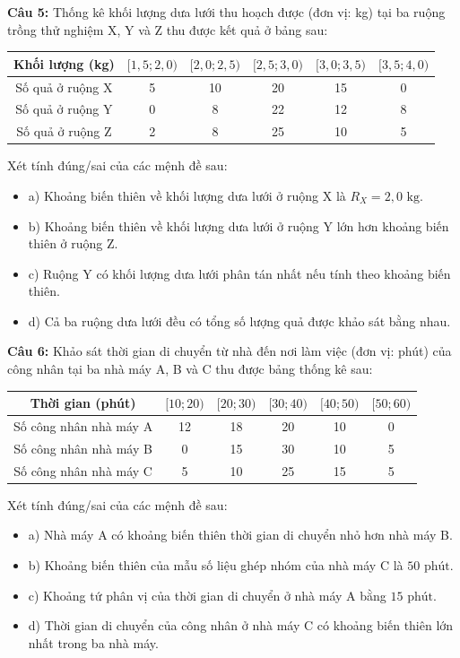 \documentclass[12pt]{article}
\begin{document}
	\noindent \textbf{Câu 5:} Thống kê khối lượng dưa lưới thu hoạch được (đơn vị: kg) tại ba ruộng trồng thử nghiệm X, Y và Z thu được kết quả ở bảng sau:
	\begin{center}
		\renewcommand{\arraystretch}{1.3}
		\begin{tabular}{|c|c|c|c|c|c|}
			\hline
			Khối lượng (kg) & $[1,5; 2,0)$ & $[2,0; 2,5)$ & $[2,5; 3,0)$ & $[3,0; 3,5)$ & $[3,5; 4,0)$ \\
			\hline
			Số quả ở ruộng X & 5 & 10 & 20 & 15 & 0 \\
			\hline
			Số quả ở ruộng Y & 0 & 8 & 22 & 12 & 8 \\
			\hline
			Số quả ở ruộng Z & 2 & 8 & 25 & 10 & 5 \\
			\hline
		\end{tabular}
	\end{center}
	Xét tính đúng/sai của các mệnh đề sau:
	\begin{itemize}[label=, leftmargin=*]
		\item  a) Khoảng biến thiên về khối lượng dưa lưới ở ruộng X là $R_X = 2,0\text{ kg}$.
		\item  b) Khoảng biến thiên về khối lượng dưa lưới ở ruộng Y lớn hơn khoảng biến thiên ở ruộng Z.
		\item  c) Ruộng Y có khối lượng dưa lưới phân tán nhất nếu tính theo khoảng biến thiên.
		\item  d) Cả ba ruộng dưa lưới đều có tổng số lượng quả được khảo sát bằng nhau.
	\end{itemize}
	
	\vspace{4mm}
	
	\noindent \textbf{Câu 6:} Khảo sát thời gian di chuyển từ nhà đến nơi làm việc (đơn vị: phút) của công nhân tại ba nhà máy A, B và C thu được bảng thống kê sau:
	\begin{center}
		\renewcommand{\arraystretch}{1.3}
		\begin{tabular}{|c|c|c|c|c|c|}
			\hline
			Thời gian (phút) & $[10; 20)$ & $[20; 30)$ & $[30; 40)$ & $[40; 50)$ & $[50; 60)$ \\
			\hline
			Số công nhân nhà máy A & 12 & 18 & 20 & 10 & 0 \\
			\hline
			Số công nhân nhà máy B & 0 & 15 & 30 & 10 & 5 \\
			\hline
			Số công nhân nhà máy C & 5 & 10 & 25 & 15 & 5 \\
			\hline
		\end{tabular}
	\end{center}
	Xét tính đúng/sai của các mệnh đề sau:
	\begin{itemize}[label=, leftmargin=*]
		\item  a) Nhà máy A có khoảng biến thiên thời gian di chuyển nhỏ hơn nhà máy B.
		\item  b) Khoảng biến thiên của mẫu số liệu ghép nhóm của nhà máy C là $50\text{ phút}$.
		\item  c) Khoảng tứ phân vị của thời gian di chuyển ở nhà máy A bằng $15\text{ phút}$.
		\item  d) Thời gian di chuyển của công nhân ở nhà máy C có khoảng biến thiên lớn nhất trong ba nhà máy.
	\end{itemize}
	
\end{document}

